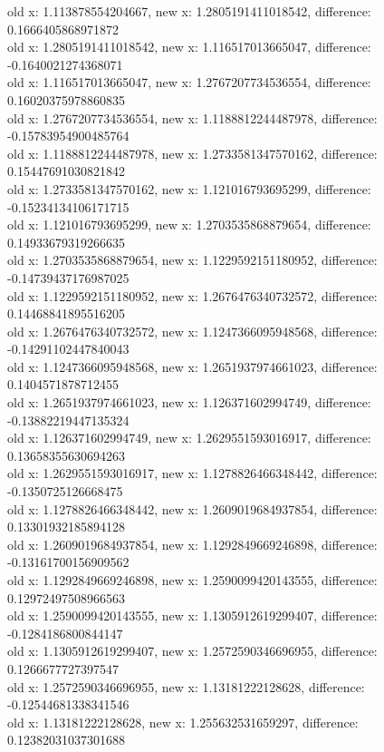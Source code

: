 \documentclass[12pt]{article}
\begin{document}
\begin{enumerate}
\begin{footnotesize}
\begin{spacing}{-.8}
old x: 1.113878554204667, new x: 1.2805191411018542, difference: 0.1666405868971872\\
old x: 1.2805191411018542, new x: 1.116517013665047, difference: -0.1640021274368071\\
old x: 1.116517013665047, new x: 1.2767207734536554, difference: 0.16020375978860835\\
old x: 1.2767207734536554, new x: 1.1188812244487978, difference: -0.15783954900485764\\
old x: 1.1188812244487978, new x: 1.2733581347570162, difference: 0.15447691030821842\\
old x: 1.2733581347570162, new x: 1.121016793695299, difference: -0.15234134106171715\\
old x: 1.121016793695299, new x: 1.2703535868879654, difference: 0.14933679319266635\\
old x: 1.2703535868879654, new x: 1.1229592151180952, difference: -0.14739437176987025\\
old x: 1.1229592151180952, new x: 1.2676476340732572, difference: 0.14468841895516205\\
old x: 1.2676476340732572, new x: 1.1247366095948568, difference: -0.14291102447840043\\
old x: 1.1247366095948568, new x: 1.2651937974661023, difference: 0.1404571878712455\\
old x: 1.2651937974661023, new x: 1.126371602994749, difference: -0.13882219447135324\\
old x: 1.126371602994749, new x: 1.2629551593016917, difference: 0.13658355630694263\\
old x: 1.2629551593016917, new x: 1.1278826466348442, difference: -0.1350725126668475\\
old x: 1.1278826466348442, new x: 1.2609019684937854, difference: 0.13301932185894128\\
old x: 1.2609019684937854, new x: 1.1292849669246898, difference: -0.13161700156909562\\
old x: 1.1292849669246898, new x: 1.2590099420143555, difference: 0.12972497508966563\\
old x: 1.2590099420143555, new x: 1.1305912619299407, difference: -0.1284186800844147\\
old x: 1.1305912619299407, new x: 1.2572590346696955, difference: 0.1266677727397547\\
old x: 1.2572590346696955, new x: 1.13181222128628, difference: -0.12544681338341546\\
old x: 1.13181222128628, new x: 1.255632531659297, difference: 0.12382031037301688\\

\end{spacing}
\end{footnotesize}
\end{enumerate}
\end{document}
